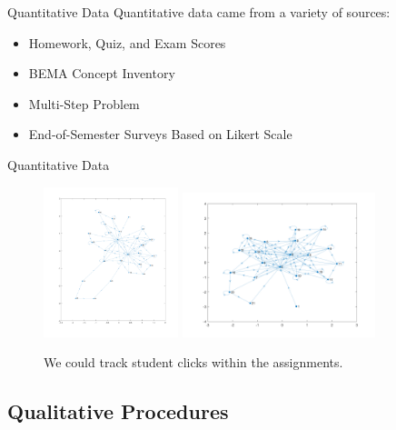 \documentclass[xcolor=x11names,compress]{beamer}
\begin{document}
\begin{frame}{Quantitative Data}
	Quantitative data came from a variety of sources:
	\begin{itemize}
		\item Homework, Quiz, and Exam Scores
		\item BEMA Concept Inventory
		\item Multi-Step Problem
		\item End-of-Semester Surveys Based on Likert Scale
	\end{itemize}
\end{frame}

\begin{frame}{Quantitative Data}
	\begin{figure}
		\centering
		\includegraphics[width=0.35\textwidth]{img/matlab_example_1.png}
		\includegraphics[width=0.50\textwidth]{img/matlab_example_2.png}
		\caption{We could track student clicks within the assignments.}
		\label{fig:matlab_examples}
	\end{figure}
\end{frame}

\subsection{Qualitative Procedures}
\end{document}
